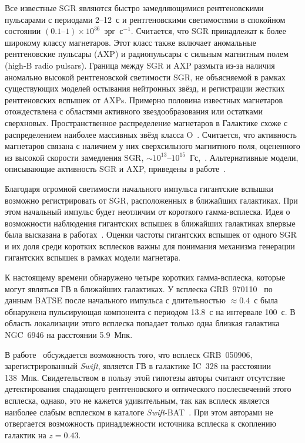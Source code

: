 Все известные SGR являются быстро замедляющимися рентгеновскими пульсарами 
с периодами 2--12~с и рентгеновскими светимостями в спокойном состоянии 
$(0.1\textrm{--}1)\times 10^{36}$~эрг~с$^{-1}$. Считается, что SGR принадлежат к 
более широкому классу магнетаров. Этот класс также включает аномальные 
рентгеновские пульсары (AXP) и радиопульсары с сильным магнитным полем (high-B radio pulsars).
Граница между SGR и AXP размыта из-за наличия аномально высокой рентгеновской светимости SGR,
не объясняемой в рамках существующих моделей остывания нейтронных звёзд, 
и регистрации жестких рентгеновских вспышек от AXPs. Примерно половина известных 
магнетаров отождествлена с областями активного звездообразования или остатками сверхновых.
Пространственное распределение магнетаров в Галактике схоже с распределением 
наиболее массивных звёзд класса O~\citep{Olausen_Kaspi2014}. Считается, что 
активность магнетаров связана с наличием у них сверхсильного магнитного поля,
оцененного из высокой скорости замедления SGR, 
$\sim 10^{13}\textrm{--}10^{15}$~Гс,~\citep{Duncan_and_Thompson_1992ApJ,Thompson_and_Duncan_1995MNRAS,Thompson_and_Duncan_1996ApJ}.
Альтернативные модели, описывающие активность SGR и AXP, приведены в работе~\citep{Bisnovatyi-Kogan_2014ARep}.

Благодаря огромной светимости начального импульса гигантские вспышки возможно  
регистрировать от SGR, расположенных в ближайших галактиках. При этом начальный 
импульс будет неотличим от короткого гамма-всплеска. Идея о возможности наблюдения 
гигантских вспышек в ближайших галактиках впервые была высказана 
в работах~\citep{Mazets1981,Mazets1982}. Оценки частоты гигантских вспышек от одного 
SGR и их доля среди коротких всплесков важны для понимания механизма генерации 
гигантских вспышек в рамках модели магнетара.

К настоящему времени обнаружено четыре коротких гамма-всплеска, которые могут 
являться ГВ в ближайших галактиках. У всплеска GRB~970110~\citep{Crider2006} 
по данным BATSE после начального импульса с длительностью $\approx 0.4$~с была 
обнаружена пульсирующая компонента с периодом 13.8~с на интервале 100~с. В область 
локализации этого всплеска попадает только одна близкая галактика NGC~6946 
на расстоянии 5.9~Мпк. 

В работе~\citep{Levan2008} обсуждается возможность того, что всплеск GRB~050906, 
зарегистрированный \textit{Swift}, является ГВ в галактике 
IC~328 на расстоянии 138~Мпк. Свидетельством в пользу этой гипотезы авторы считают  
отсутствие детектирования спадающего рентгеновского и оптического послесвечений этого всплеска, 
однако, это не кажется удивительным, так как всплеск является наиболее слабым всплеском 
в каталоге \textit{Swift}-BAT~\citep{Sakamoto2011ApJS}. При этом 
авторами не отвергается возможность принадлежности источника всплеска к скоплению 
галактик на $z = 0.43$. 

